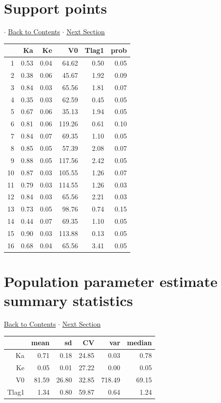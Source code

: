 \documentclass{article}
\begin{document}
          \section{Support points} 
 $\cdot$ \hyperlink{tableofcontents}{Back to Contents} $\cdot$ \hyperlink{ppe}{Next Section} \newline
          \newline 
\begin{tabular}{rrrrrr}
  \hline
 & Ka & Ke & V0 & Tlag1 & prob \\ 
  \hline
1 & 0.53 & 0.04 & 64.62 & 0.50 & 0.05 \\ 
  2 & 0.38 & 0.06 & 45.67 & 1.92 & 0.09 \\ 
  3 & 0.84 & 0.03 & 65.56 & 1.81 & 0.07 \\ 
  4 & 0.35 & 0.03 & 62.59 & 0.45 & 0.05 \\ 
  5 & 0.67 & 0.06 & 35.13 & 1.94 & 0.05 \\ 
  6 & 0.81 & 0.06 & 119.26 & 0.61 & 0.10 \\ 
  7 & 0.84 & 0.07 & 69.35 & 1.10 & 0.05 \\ 
  8 & 0.85 & 0.05 & 57.39 & 2.08 & 0.07 \\ 
  9 & 0.88 & 0.05 & 117.56 & 2.42 & 0.05 \\ 
  10 & 0.87 & 0.03 & 105.55 & 1.26 & 0.07 \\ 
  11 & 0.79 & 0.03 & 114.55 & 1.26 & 0.03 \\ 
  12 & 0.84 & 0.03 & 65.56 & 2.21 & 0.03 \\ 
  13 & 0.73 & 0.05 & 98.76 & 0.74 & 0.15 \\ 
  14 & 0.44 & 0.07 & 69.35 & 1.10 & 0.05 \\ 
  15 & 0.90 & 0.03 & 113.88 & 0.13 & 0.05 \\ 
  16 & 0.68 & 0.04 & 65.56 & 3.41 & 0.05 \\ 
   \hline
\end{tabular}
              
          \hypertarget{ppe}{}
          
          \section{Population parameter estimate summary statistics} 
 \hyperlink{tableofcontents}{Back to Contents} $\cdot$ \hyperlink{covforppe}{Next Section} \newline
          \newline 
\begin{tabular}{rrrrrr}
  \hline
 & mean & sd & CV & var & median \\ 
  \hline
Ka & 0.71 & 0.18 & 24.85 & 0.03 & 0.78 \\ 
  Ke & 0.05 & 0.01 & 27.22 & 0.00 & 0.05 \\ 
  V0 & 81.59 & 26.80 & 32.85 & 718.49 & 69.15 \\ 
  Tlag1 & 1.34 & 0.80 & 59.87 & 0.64 & 1.24 \\ 
   \hline
\end{tabular}
\newpage
          
\end{document}

